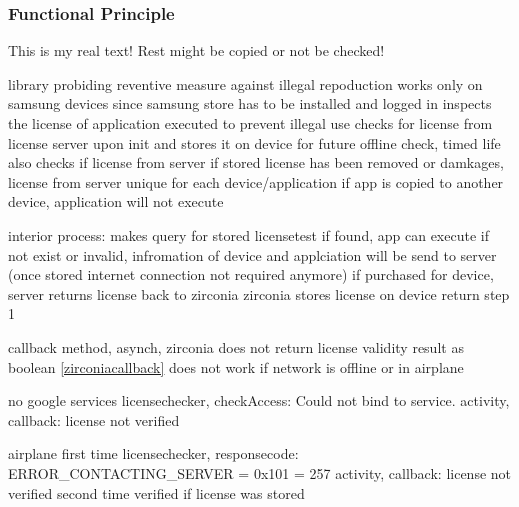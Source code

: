 \subsubsection{Functional Principle} \label{subsection:license-samsung-functional}
This is my real text! Rest might be copied or not be checked!

%
library probiding reventive measure against illegal repoduction
works only on samsung devices since samsung store has to be installed and logged in
inspects the license of application executed to prevent illegal use
checks for license from license server upon init and stores it on device for future offline check, timed life
also checks if license from server if stored license has been removed or damkages, license from server unique for each device/application
if app is copied to another device, application will not execute

interior process:
makes query for stored licensetest
if found, app can execute
if not exist or invalid, infromation of device and applciation will be send to server (once stored internet connection not required anymore)
if purchased for device, server returns license back to zirconia
zirconia stores license on device
return step 1

callback method, asynch, zirconia does not return license validity result as boolean \ref{zirconiacallback}
does not work if network is offline or in airplane

\cite{samsungZirconia}
%



no google services
licensechecker, checkAccess: Could not bind to service.
activity, callback: license not verified

airplane
first time
licensechecker, responsecode: ERROR_CONTACTING_SERVER = 0x101 = 257
activity, callback: license not verified
second time
verified if license was stored
